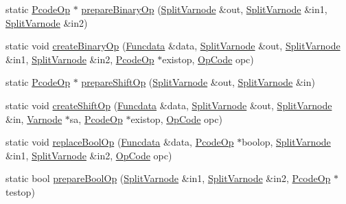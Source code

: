 \begin{DoxyCompactItemize}
\item 
static \mbox{\hyperlink{class_pcode_op}{Pcode\+Op}} $\ast$ \mbox{\hyperlink{class_split_varnode_a38d72b3185eeb4255fb3d1c997780977}{prepare\+Binary\+Op}} (\mbox{\hyperlink{class_split_varnode}{Split\+Varnode}} \&out, \mbox{\hyperlink{class_split_varnode}{Split\+Varnode}} \&in1, \mbox{\hyperlink{class_split_varnode}{Split\+Varnode}} \&in2)
\item 
static void \mbox{\hyperlink{class_split_varnode_a20df0a8fa4eba1c02fd24ae129272d71}{create\+Binary\+Op}} (\mbox{\hyperlink{class_funcdata}{Funcdata}} \&data, \mbox{\hyperlink{class_split_varnode}{Split\+Varnode}} \&out, \mbox{\hyperlink{class_split_varnode}{Split\+Varnode}} \&in1, \mbox{\hyperlink{class_split_varnode}{Split\+Varnode}} \&in2, \mbox{\hyperlink{class_pcode_op}{Pcode\+Op}} $\ast$existop, \mbox{\hyperlink{opcodes_8hh_abeb7dfb0e9e2b3114e240a405d046ea7}{Op\+Code}} opc)
\item 
static \mbox{\hyperlink{class_pcode_op}{Pcode\+Op}} $\ast$ \mbox{\hyperlink{class_split_varnode_a5a10435148bcdd7f5e09cface0c1998f}{prepare\+Shift\+Op}} (\mbox{\hyperlink{class_split_varnode}{Split\+Varnode}} \&out, \mbox{\hyperlink{class_split_varnode}{Split\+Varnode}} \&in)
\item 
static void \mbox{\hyperlink{class_split_varnode_a106126352280623608ffbb571d25b387}{create\+Shift\+Op}} (\mbox{\hyperlink{class_funcdata}{Funcdata}} \&data, \mbox{\hyperlink{class_split_varnode}{Split\+Varnode}} \&out, \mbox{\hyperlink{class_split_varnode}{Split\+Varnode}} \&in, \mbox{\hyperlink{class_varnode}{Varnode}} $\ast$sa, \mbox{\hyperlink{class_pcode_op}{Pcode\+Op}} $\ast$existop, \mbox{\hyperlink{opcodes_8hh_abeb7dfb0e9e2b3114e240a405d046ea7}{Op\+Code}} opc)
\item 
static void \mbox{\hyperlink{class_split_varnode_afcb8b8c5221764a535eb066b15149f84}{replace\+Bool\+Op}} (\mbox{\hyperlink{class_funcdata}{Funcdata}} \&data, \mbox{\hyperlink{class_pcode_op}{Pcode\+Op}} $\ast$boolop, \mbox{\hyperlink{class_split_varnode}{Split\+Varnode}} \&in1, \mbox{\hyperlink{class_split_varnode}{Split\+Varnode}} \&in2, \mbox{\hyperlink{opcodes_8hh_abeb7dfb0e9e2b3114e240a405d046ea7}{Op\+Code}} opc)
\item 
static bool \mbox{\hyperlink{class_split_varnode_ab869c695dd00e22e544be6f0090178af}{prepare\+Bool\+Op}} (\mbox{\hyperlink{class_split_varnode}{Split\+Varnode}} \&in1, \mbox{\hyperlink{class_split_varnode}{Split\+Varnode}} \&in2, \mbox{\hyperlink{class_pcode_op}{Pcode\+Op}} $\ast$testop)
\item 

\end{DoxyCompactItemize}
